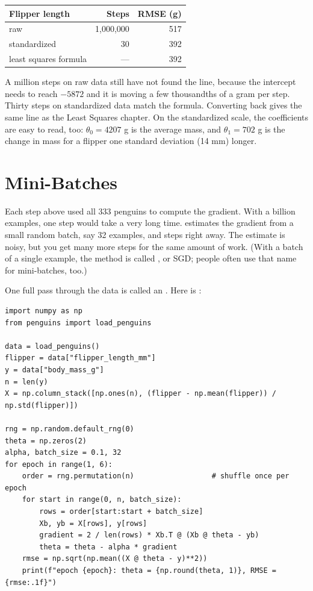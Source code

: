 \begin{center}
\begin{tabular}{l r r}
\textbf{Flipper length} & \textbf{Steps} & \textbf{RMSE (g)} \\
\hline
raw & 1,000,000 & 517 \\
standardized & 30 & 392 \\
least squares formula & --- & 392 \\
\end{tabular}
\end{center}

A million steps on raw data still have not found the line, because the intercept needs to reach $-5872$ and
it is moving a few thousandths of a gram per step. Thirty steps on standardized data match the formula.
Converting back gives the same line as the Least Squares chapter. On the standardized scale, the
coefficients are easy to read, too: $\theta_0 = 4207$ g is the average mass, and $\theta_1 = 702$ g is the
change in mass for a flipper one standard deviation (14 mm) longer.

\section{Mini-Batches}
Each step above used all 333 penguins to compute the gradient. With a billion examples, one step would take a
very long time.  estimates the gradient from a small random batch,
say 32 examples, and steps right away. The estimate is noisy, but you get many more steps for the same
amount of work. (With a batch of a single example, the method is called ,
or SGD; people often use that name for mini-batches, too.)

One full pass through the data is called an . Here is :
\begin{verbatim}
import numpy as np
from penguins import load_penguins

data = load_penguins()
flipper = data["flipper_length_mm"]
y = data["body_mass_g"]
n = len(y)
X = np.column_stack([np.ones(n), (flipper - np.mean(flipper)) / np.std(flipper)])

rng = np.random.default_rng(0)
theta = np.zeros(2)
alpha, batch_size = 0.1, 32
for epoch in range(1, 6):
    order = rng.permutation(n)                  # shuffle once per epoch
    for start in range(0, n, batch_size):
        rows = order[start:start + batch_size]
        Xb, yb = X[rows], y[rows]
        gradient = 2 / len(rows) * Xb.T @ (Xb @ theta - yb)
        theta = theta - alpha * gradient
    rmse = np.sqrt(np.mean((X @ theta - y)**2))
    print(f"epoch {epoch}: theta = {np.round(theta, 1)}, RMSE = {rmse:.1f}")
\end{verbatim}

